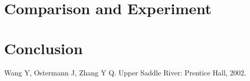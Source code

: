 \documentclass[a4paper, twocolumn]{article}
\begin{document}
	
	
	\section{Comparison and Experiment}
	
	
	
	\section{Conclusion}
	
	
	
	\begin{thebibliography}{99} %
		
		Wang Y, Ostermann J, Zhang Y Q. 
		\newblock Upper Saddle River: Prentice Hall, 2002.
		
	\end{thebibliography}
	
	
\end{document}
